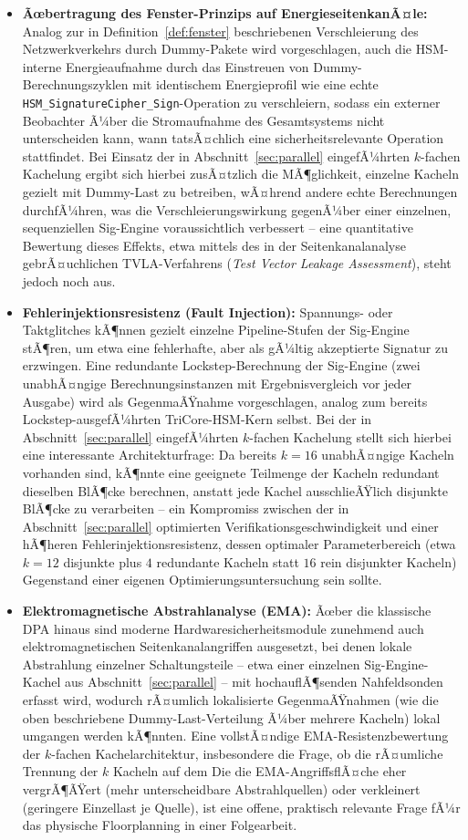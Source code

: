 ﻿\documentclass[a4paper,12pt]{article}
\theoremstyle{definition}
\begin{document}
\begin{itemize}
	\item \textbf{Ãœbertragung des Fenster-Prinzips auf EnergieseitenkanÃ¤le:} Analog zur in Definition~\ref{def:fenster} beschriebenen Verschleierung des Netzwerkverkehrs durch Dummy-Pakete wird vorgeschlagen, auch die HSM-interne Energieaufnahme durch das Einstreuen von Dummy-Berechnungszyklen mit identischem Energieprofil wie eine echte \texttt{HSM\_SignatureCipher\_Sign}-Operation zu verschleiern, sodass ein externer Beobachter Ã¼ber die Stromaufnahme des Gesamtsystems nicht unterscheiden kann, wann tatsÃ¤chlich eine sicherheitsrelevante Operation stattfindet. Bei Einsatz der in Abschnitt~\ref{sec:parallel} eingefÃ¼hrten $k$-fachen Kachelung ergibt sich hierbei zusÃ¤tzlich die MÃ¶glichkeit, einzelne Kacheln gezielt mit Dummy-Last zu betreiben, wÃ¤hrend andere echte Berechnungen durchfÃ¼hren, was die Verschleierungswirkung gegenÃ¼ber einer einzelnen, sequenziellen Sig-Engine voraussichtlich verbessert -- eine quantitative Bewertung dieses Effekts, etwa mittels des in der Seitenkanalanalyse gebrÃ¤uchlichen TVLA-Verfahrens (\emph{Test Vector Leakage Assessment}), steht jedoch noch aus.
	\item \textbf{Fehlerinjektionsresistenz (Fault Injection):} Spannungs- oder Taktglitches kÃ¶nnen gezielt einzelne Pipeline-Stufen der Sig-Engine stÃ¶ren, um etwa eine fehlerhafte, aber als gÃ¼ltig akzeptierte Signatur zu erzwingen. Eine redundante Lockstep-Berechnung der Sig-Engine (zwei unabhÃ¤ngige Berechnungsinstanzen mit Ergebnisvergleich vor jeder Ausgabe) wird als GegenmaÃŸnahme vorgeschlagen, analog zum bereits Lockstep-ausgefÃ¼hrten TriCore-HSM-Kern selbst. Bei der in Abschnitt~\ref{sec:parallel} eingefÃ¼hrten $k$-fachen Kachelung stellt sich hierbei eine interessante Architekturfrage: Da bereits $k=16$ unabhÃ¤ngige Kacheln vorhanden sind, kÃ¶nnte eine geeignete Teilmenge der Kacheln redundant dieselben BlÃ¶cke berechnen, anstatt jede Kachel ausschlieÃŸlich disjunkte BlÃ¶cke zu verarbeiten -- ein Kompromiss zwischen der in Abschnitt~\ref{sec:parallel} optimierten Verifikationsgeschwindigkeit und einer hÃ¶heren Fehlerinjektionsresistenz, dessen optimaler Parameterbereich (etwa $k=12$ disjunkte plus $4$ redundante Kacheln statt $16$ rein disjunkter Kacheln) Gegenstand einer eigenen Optimierungsuntersuchung sein sollte.
	\item \textbf{Elektromagnetische Abstrahlanalyse (EMA):} Ãœber die klassische DPA hinaus sind moderne Hardwaresicherheitsmodule zunehmend auch elektromagnetischen Seitenkanalangriffen ausgesetzt, bei denen lokale Abstrahlung einzelner Schaltungsteile -- etwa einer einzelnen Sig-Engine-Kachel aus Abschnitt~\ref{sec:parallel} -- mit hochauflÃ¶senden Nahfeldsonden erfasst wird, wodurch rÃ¤umlich lokalisierte GegenmaÃŸnahmen (wie die oben beschriebene Dummy-Last-Verteilung Ã¼ber mehrere Kacheln) lokal umgangen werden kÃ¶nnten. Eine vollstÃ¤ndige EMA-Resistenzbewertung der $k$-fachen Kachelarchitektur, insbesondere die Frage, ob die rÃ¤umliche Trennung der $k$ Kacheln auf dem Die die EMA-AngriffsflÃ¤che eher vergrÃ¶ÃŸert (mehr unterscheidbare Abstrahlquellen) oder verkleinert (geringere Einzellast je Quelle), ist eine offene, praktisch relevante Frage fÃ¼r das physische Floorplanning in einer Folgearbeit.
\end{itemize}
\end{document}

